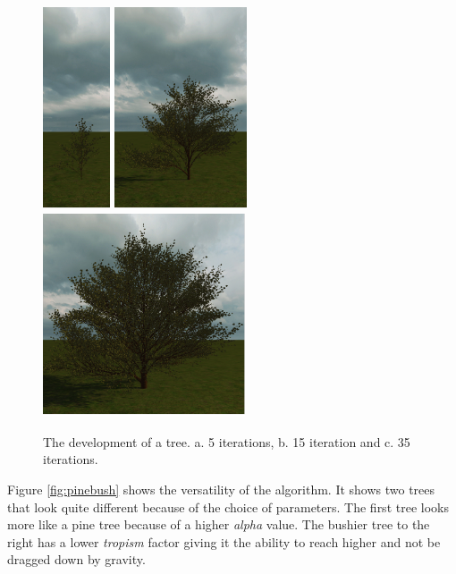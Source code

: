 \documentclass{article}
\begin{document}
  		\begin{figure}[h!]
  			\centering
  			\includegraphics[height=6cm]{treegrowth1}
  			\includegraphics[height=6cm]{treegrowth2}
  			\includegraphics[height=6cm]{treegrowth3}

  			\caption{The development of a tree. a. 5 iterations, b. 15 iteration and c. 35 iterations. }
  			\label{fig:treegrowth}
  		\end{figure}
  	
  		Figure \ref{fig:pinebush} shows the versatility of the algorithm. It shows two trees that look quite different because of the choice of parameters. The first tree looks more like a pine tree because of a higher \textit{alpha } value. The bushier tree to the right has a lower \textit{tropism} factor giving it the ability to reach higher and not be dragged down by gravity.
  	
\end{document}
